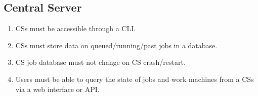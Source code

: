 \subsection{Central Server}
\begin{enumerate}
 \item CSs must be accessible through a CLI.
 \item CSs must store data on queued/running/past jobs in a database.
 \item CS job database must not change on CS crash/restart.
 \item Users must be able to query the state of jobs and work machines from a CSs via a web interface or API.
\end{enumerate}

